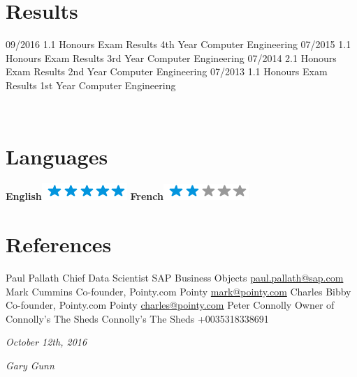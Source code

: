 \documentclass[]{friggeri-cv}
\begin{document}
\section{Results}
\begin{entrylist}
  \entry
    {09/2016}
    {1.1 Honours}
    {Exam Results}
    {4th Year Computer Engineering}
  \entry
    {07/2015}
    {1.1 Honours}
    {Exam Results}
    {3rd Year Computer Engineering}
  \entry
    {07/2014}
    {2.1 Honours}
    {Exam Results}
    {2nd Year Computer Engineering}
  \entry
    {07/2013}
    {1.1 Honours}
    {Exam Results}
    {1st Year Computer Engineering}

\end{entrylist}

\newpage

\begin{aside}
~
~
~
  \section{Languages}
    \textbf{English}\includegraphics[scale=0.40]{img/5stars.png}
    \textbf{French}\includegraphics[scale=0.40]{img/2stars.png}
    ~
\end{aside}


\section{References}
\begin{entrylist}
  \entry
    {Paul Pallath}
    {Chief Data Scientist}
    {SAP Business Objects}
    {\href{mailto:paul.pallath@sap.com}{paul.pallath@sap.com}}
  \entry
    {Mark Cummins}
    {Co-founder, Pointy.com}
    {Pointy}
    {\href{mailto:mark@pointy.com}{mark@pointy.com}}
  \entry
    {Charles Bibby}
    {Co-founder, Pointy.com}
    {Pointy}
    {\href{mailto:charles@pointy.com}{charles@pointy.com}}
  \entry
    {Peter Connolly}
    {Owner of Connolly's The Sheds}
    {Connolly's The Sheds}
    {+0035318338691}
    
    
\end{entrylist}


\begin{flushleft}
\emph{October 12th, 2016}
\end{flushleft}
\begin{flushright}
\emph{Gary Gunn}
\end{flushright}
\end{document}
